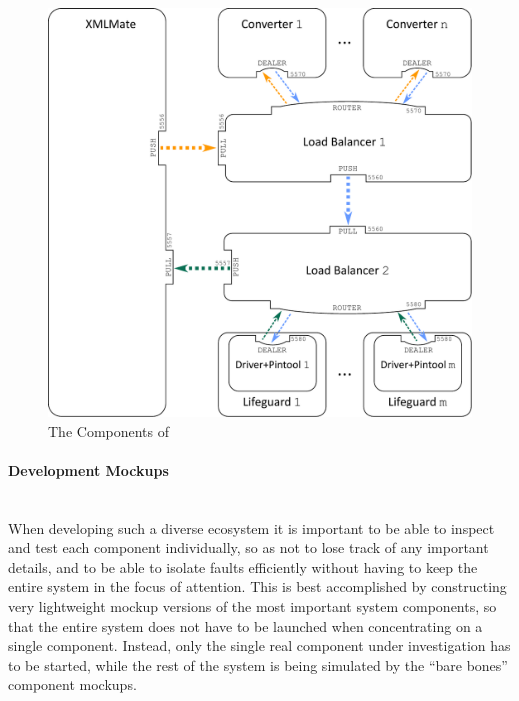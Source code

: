 \begin{figure}[htb]
\centering
  \includegraphics[width=\columnwidth]{system.pdf} 
  \caption{The Components of \xmlmate}
  \label{fig:components}
\end{figure}

\paragraph{Development Mockups} ~\\
When developing such a diverse ecosystem it is important to be able to inspect and test each component
individually, so as not to lose track of any important details, and to be able to isolate faults efficiently
without having to keep the entire system in the focus of attention. %
This is best accomplished by constructing
very lightweight mockup versions of the most important system components, so that the entire system does not
have to be launched when concentrating on a single component. Instead, only the single real component under
investigation has to be started, while the rest of the system is being simulated by the ``bare bones''
component mockups.

